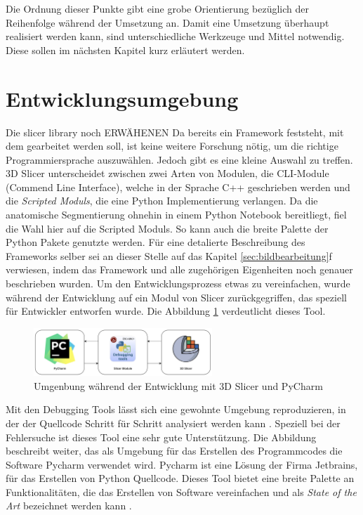 Die Ordnung dieser Punkte gibt eine grobe Orientierung bezüglich der Reihenfolge
während der Umsetzung an. Damit eine Umsetzung überhaupt realisiert werden kann,
sind unterschiedliche Werkzeuge und Mittel notwendig. Diese sollen im nächsten Kapitel
kurz erläutert werden.

\section{Entwicklungsumgebung}
Die slicer library noch ERWÄHENEN Da bereits ein Framework feststeht, mit dem
gearbeitet werden soll, ist keine weitere Forschung nötig, um die richtige
Programmiersprache auszuwählen. Jedoch gibt es eine kleine Auswahl zu treffen.
3D Slicer unterscheidet zwischen zwei Arten von Modulen, die CLI-Module (Commend
Line Interface), welche in der Sprache C++ geschrieben werden und die \textit{Scripted
Moduls}, die eine Python Implementierung verlangen. Da die anatomische Segmentierung
ohnehin in einem Python Notebook bereitliegt, fiel die Wahl hier auf die
Scripted Moduls. So kann auch die breite Palette der Python Pakete genutzte werden.
Für eine detalierte Beschreibung des Frameworks selber sei an dieser Stelle auf
das Kapitel \ref{sec:bildbearbeitung}f verwiesen, indem das Framework und alle
zugehörigen Eigenheiten noch genauer beschrieben wurden. Um den Entwicklungsprozess
etwas zu vereinfachen, wurde während der Entwicklung auf ein Modul von Slicer
zurückgegriffen, das speziell für Entwickler entworfen wurde. Die Abbildung
\ref{fig:entwicklungsumgebung} verdeutlicht dieses Tool.

\begin{figure}[h]
	\centering
	\includegraphics[width=0.6\textwidth]{img/Entwicklungsumgebung.png}
	\caption{Umgenbung während der Entwicklung mit 3D Slicer und PyCharm}
	\label{fig:entwicklungsumgebung}
\end{figure}

Mit den Debugging Tools lässt sich eine gewohnte Umgebung reproduzieren, in der
der Quellcode Schritt für Schritt analysiert werden kann \citep[vgl.][]{slicerdebuggingtools}.
Speziell bei der Fehlersuche ist dieses Tool eine sehr gute Unterstützung. Die Abbildung
beschreibt weiter, das als Umgebung für das Erstellen des Programmcodes die
Software Pycharm verwendet wird. Pycharm ist eine Lösung der Firma Jetbrains,
für das Erstellen von Python Quellcode. Dieses Tool bietet eine breite Palette an
Funktionalitäten, die das Erstellen von Software vereinfachen und als \textit{State
of the Art} bezeichnet werden kann \citep[vgl.][]{jetbrains2024}.

